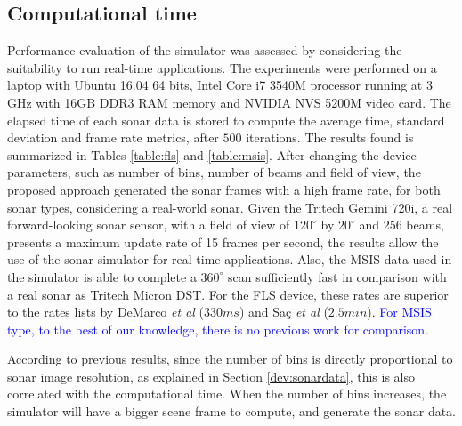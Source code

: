 \documentclass[final,5p,times]{elsarticle}
\begin{document}
\subsection{Computational time}

Performance evaluation of the simulator was assessed by considering the suitability to run real-time applications. The experiments were performed on a laptop with Ubuntu 16.04 64 bits, Intel Core i7 3540M processor running at 3 GHz with 16GB DDR3 RAM memory and NVIDIA NVS 5200M video card. The elapsed time of each sonar data is stored to compute the average time, standard deviation and frame rate metrics, after $500$ iterations. The results found is summarized in Tables \ref{table:fls} and \ref{table:msis}. After changing the device parameters, such as number of bins, number of beams and field
of view, the proposed approach generated the sonar frames with a high
frame rate, for both sonar types, considering a real-world sonar. Given the Tritech Gemini 720i, a real forward-looking sonar sensor, with a field of view of $120^{\circ}$ by $20^{\circ}$ and 256 beams, presents a maximum update rate of 15 frames per second, the results allow the use of the sonar simulator for real-time applications. Also, the MSIS data used in the simulator is able to complete a $360^{\circ}$ scan sufficiently fast in comparison with a
real sonar as Tritech Micron DST. For the FLS device, these rates are superior to the rates lists by DeMarco \textit{et al} \cite{demarco2015} ($330 ms$) and Saç \textit{et al} \cite{sac2015} ($2.5 min$). \textcolor{blue}{For MSIS type, to the best of our knowledge, there is no previous work for comparison.}

According to previous results, since the number of bins is directly
proportional to sonar image resolution, as explained in Section
\ref{dev:sonardata}, this is also correlated with the computational time. When the number of bins increases, the simulator will have a bigger scene frame to compute, and generate the sonar data.

\end{document}
